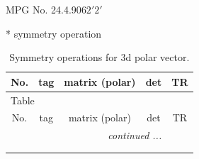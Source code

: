 \documentclass[fleqn,8pt]{jsarticle}
\begin{document}
\setcounter{MaxMatrixCols}{32}

\renewcommand{\tablename}{Table~}
\renewcommand{\figurename}{Figure~}
\begin{center}
\LARGE
MPG No. 24.4.90\quad$62'2'$
\end{center}
* symmetry operation
\renewcommand{\arraystretch}{1.3}
\begin{longtable}{ccccc}
\caption{Symmetry operations for 3d polar vector.}
 \\
 \hline \hline
No. & tag & matrix (polar) & det & TR \\ \hline \endfirsthead

\multicolumn{4}{l}{\tablename\ \thetable{}} \\
 \hline \hline
No. & tag & matrix (polar) & det & TR \\ \hline \endhead

 \hline \hline
\multicolumn{4}{r}{\footnotesize\it continued ...} \\ \endfoot

 \hline \hline
\multicolumn{4}{r}{} \\ \endlastfoot


\end{longtable}
\end{document}
